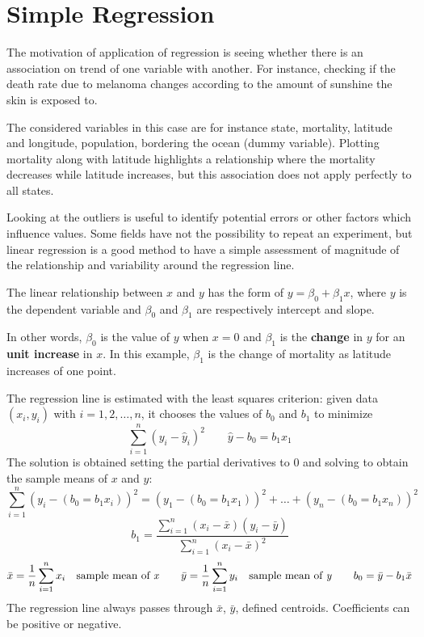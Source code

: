 \section{Simple Regression}
The motivation of application of regression is seeing whether there is an association on trend of one variable with another. For instance, checking if the death rate due to melanoma changes according to the amount of sunshine the skin is exposed to.

The considered variables in this case are for instance state, mortality, latitude and longitude, population, bordering the ocean (dummy variable). Plotting mortality along with latitude highlights a relationship where the mortality decreases while latitude increases, but this association does not apply perfectly to all states. 

Looking at the outliers is useful to identify potential errors or other factors which influence values. Some fields have not the possibility to repeat an experiment, but linear regression is a good method to have a simple assessment of magnitude of the relationship and variability around the regression line. 

The linear relationship between $x$ and $y$ has the form of $y = \beta_0 + \beta_1 x$, where $y$ is the dependent variable and $\beta_0$ and $\beta_1$ are respectively intercept and slope.

In other words, $\beta_0$ is the value of $y$ when $x = 0$ and $\beta_1$ is the \textbf{change} in $y$ for an \textbf{unit increase} in $x$. In this example, $\beta_1$ is the change of mortality as latitude increases of one point.

The regression line is estimated with the least squares criterion: given data $(x_i, y_i)$ with $i = 1, 2, \dots, n$, it chooses the values of $b_0$ and $b_1$ to minimize
$$\sum_{i=1}^{n}(y_i - \hat{y}_i)^2 \qquad \hat{y} - b_0 = b_1x_1$$
The solution is obtained setting the partial derivatives to 0 and solving to obtain the sample means of $x$ and $y$:
$$\sum_{i=1}^{n} (y_i - (b_0 = b_1 x_i))^2 = (y_1 - (b_0 = b_1x_1))^2 + \dots + (y_n - (b_0 = b_1 x_n))^2$$
$$b_1 = \frac{\sum_{i=1}^{n}(x_i - \bar{x})(y_i - \bar{y})}{\sum_{i=1}^{n}(x_i - \bar{x})^2}$$
$$\bar{x} = \frac{1}{n} \sum_{i=1}^{n}x_i \quad \text{sample mean of \textit{x}} \qquad \bar{y} = \frac{1}{n} \sum_{i=1}^{n}y_i \quad \text{sample mean of \textit{y}} \qquad b_0 = \bar{y} - b_1 \bar{x}$$
The regression line always passes through $\bar{x}$, $\bar{y}$, defined centroids. Coefficients can be positive or negative. 

